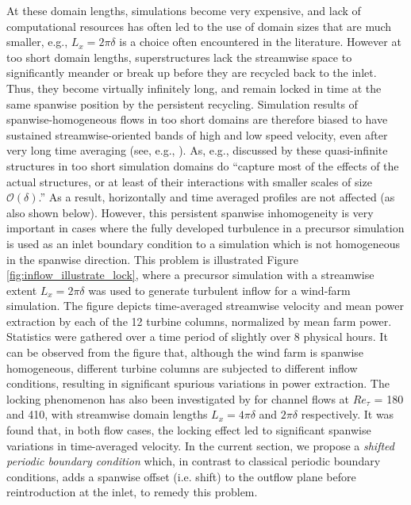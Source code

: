 At these domain lengths, simulations become very expensive, and lack of computational resources has often led to the use of domain sizes that are much
smaller, e.g., $L_x=2\pi\delta$ is a choice often encountered in the literature. However at too short domain lengths, superstructures lack the
streamwise space to significantly meander or break up before they are recycled back to the inlet. Thus, they become virtually infinitely long, and
remain locked in time at the same spanwise position by the persistent recycling. Simulation results of spanwise-homogeneous flows in too short domains
are therefore biased to have sustained streamwise-oriented bands of high and low speed velocity, even after very long time averaging (see, e.g.,
\citealp{lu2010modulated, verhulst2014large, alqadi2015large}). As, e.g., discussed by \cite{lozanoduran2014effect} these quasi-infinite structures in
too short simulation domains do ``capture most of the effects of the actual structures, or at least of their interactions with smaller scales of size
$\mathcal{O}(\delta)$.'' As a result, horizontally and time averaged profiles are not affected (as also shown below). However, this
persistent spanwise inhomogeneity is very important in cases where the fully developed turbulence in a precursor simulation is used as an inlet
boundary condition to a simulation which is not homogeneous in the spanwise direction. This problem is illustrated Figure
\ref{fig:inflow_illustrate_lock}, where a precursor simulation with a streamwise extent $L_x=2\pi\delta$ was used to generate turbulent inflow for a
wind-farm simulation. The figure depicts time-averaged streamwise velocity and mean power extraction by each of the 12 turbine columns, normalized by
mean farm power. Statistics were gathered over a time period of slightly over 8 physical hours. It can be observed from the figure that, although the
wind farm is spanwise homogeneous, different turbine columns are subjected to different inflow conditions, resulting in significant spurious variations in power extraction. 
The locking phenomenon has also been investigated by \cite{fishpool2009persistent} for channel flows at $Re_\tau$ = 180 and 410, with streamwise
domain lengths $L_x = 4\pi\delta$ and $2\pi\delta$ respectively. It was found that, in both flow cases, the locking effect led to significant spanwise
variations in time-averaged velocity. In the current section, we propose a \emph{shifted periodic boundary condition} which, in contrast to classical
periodic boundary conditions, adds a spanwise offset (i.e. shift) to the outflow plane before reintroduction at the inlet, to remedy this problem. 

